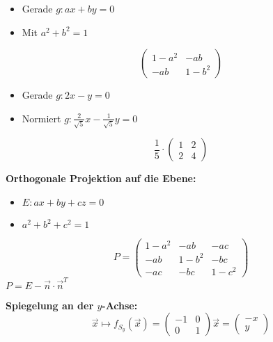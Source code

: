 \hrulefill

\begin{multicols}{2}
    \begin{itemize}
        \item Gerade $g: ax + by = 0$
        \item Mit $a^2 + b^2 = 1$
    \end{itemize}
    \[\left(
    \begin{array}{cc}
        1-a^2 & -ab \\ -ab & 1-b^2
    \end{array}
    \right)\]
\end{multicols}

\hrulefill

\begin{multicols}{2}
    \raggedright
    \begin{itemize}
        \item Gerade $g: 2x - y = 0$\\
        \item Normiert $g: \frac{2}{\sqrt{5}} x - \frac{1}{\sqrt{5}} y = 0$
    \end{itemize}
    \[\frac{1}{5} \cdot \left(
    \begin{array}{cc}
        1 & 2 \\ 2 & 4
    \end{array}
    \right)\]
\end{multicols}

\hrulefill

\textbf{Orthogonale Projektion auf die Ebene:}
\begin{itemize}
    \item $E: ax + by + cz = 0$
    \item $a^2 + b^2 + c^2 = 1$
\end{itemize}
\[P = \left(
\begin{array}{ccc}
    1-a^2 & -ab   & -ac   \\
    -ab   & 1-b^2 & -bc   \\
    -ac   & -bc   & 1-c^2
\end{array}
\right)\]
$P = E - \vec{n} \cdot \vec{n}^T$


\textbf{Spiegelung an der $y$-Achse:}
\[\vec{x} \mapsto f_{S_y}(\vec{x}) = \left(
\begin{array}{cc}
    -1 & 0 \\ 0 & 1
\end{array}
\right) \vec{x} = \left(
\begin{array}{c}
    -x \\ y
\end{array}
\right)\]

